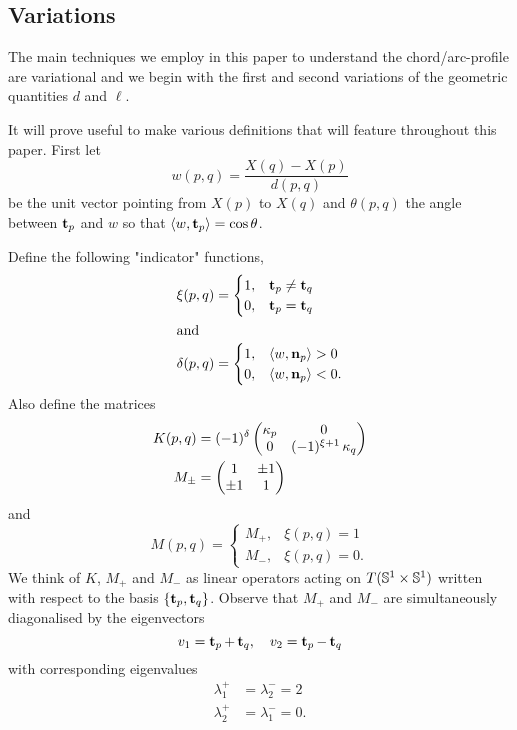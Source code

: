 \documentclass[11pt]{amsart}
\begin{document}
\subsection{Variations}
\label{sec:orgheadline8}

The main techniques we employ in this paper to understand the chord/arc-profile are variational and we begin with the first and second variations of the geometric quantities \(d\) and \(\ell\).

It will prove useful to make various definitions that will feature throughout this paper. First let
\[
w(p, q) = \frac{X(q) - X(p)}{d(p,q)}
\]
be the unit vector pointing from \(X(p)\) to \(X(q)\) and \(\theta(p,q)\) the angle between \(\operatorname{\mathbf{t}}_{p}\) and \(w\) so that \(\langle{w},{\operatorname{\mathbf{t}}_p}\rangle = \cos\theta\). 

Define the following "indicator" functions,
\begin{align*}
\xi(p, q) &= \begin{cases}
1,& \operatorname{\mathbf{t}}_{p} \ne \operatorname{\mathbf{t}}_{q} \\
0,& \operatorname{\mathbf{t}}_{p} = \operatorname{\mathbf{t}}_{q}
\end{cases} \\
\intertext{and}
\delta(p, q) &= \begin{cases}
1,& \langle{w},{\operatorname{\mathbf{n}}_{p}}\rangle > 0 \\
0,& \langle{w},{\operatorname{\mathbf{n}}_{p}}\rangle < 0.
\end{cases}
\end{align*}
Also define the matrices
\begin{align*}
K(p,q) &= (-1)^{\delta}\begin{pmatrix}
\operatorname{\kappa}_{p} & 0 \\
0 & (-1)^{\xi +1} \operatorname{\kappa}_{q}
\end{pmatrix} \\
M_{\pm} &= \begin{pmatrix}
1 & \pm 1 \\
\pm 1 & 1 
\end{pmatrix}
\end{align*}
and
\[
M(p,q) = \begin{cases}
M_+,& \xi(p,q) = 1 \\
M_-,& \xi(p,q) = 0.
\end{cases}
\]
We think of \(K\), \(M_+\) and \(M_-\) as linear operators acting on \(T(\mathbb{S}^1\times\mathbb{S}^1)\) written with respect to the basis \(\{\operatorname{\mathbf{t}}_p, \operatorname{\mathbf{t}}_q\}\). Observe that \(M_+\) and \(M_-\) are simultaneously diagonalised by the eigenvectors 
\begin{equation}
\label{eq:eigenvectors}
v_1 = \operatorname{\mathbf{t}}_{p} + \operatorname{\mathbf{t}}_{q}, \quad v_2 = \operatorname{\mathbf{t}}_{p} - \operatorname{\mathbf{t}}_{q}
\end{equation}
with corresponding eigenvalues
\begin{equation}
\label{eq:eigenvalues}
\begin{split}
\lambda^+_1 &= \lambda^-_2 = 2 \\
\lambda^+_2 &= \lambda^-_1 = 0.
\end{split}
\end{equation} 
\end{document}
